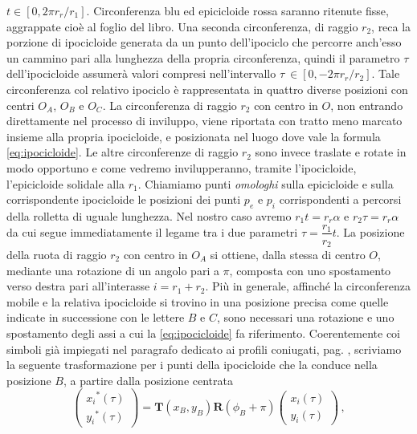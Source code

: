  $t \in[0, 2\pi r_r/r_1]$. Circonferenza blu ed epicicloide rossa saranno
ritenute fisse, aggrappate cio\`e al foglio del libro.
\noindent Una seconda circonferenza, di raggio $r_2$, reca
la porzione di ipocicloide generata da un punto dell'ipociclo
che percorre anch'esso un cammino pari alla lunghezza della propria circonferenza, quindi
il parametro $\tau$ dell'ipocicloide
assumer\`a valori compresi nell'intervallo $\tau\ \in [0, -2\pi r_r/r_2]$.
Tale circonferenza col relativo ipociclo \`e rappresentata in quattro
diverse posizioni
con centri $O_{\scriptscriptstyle A}$, $O_{\scriptscriptstyle B}$ e $O_{\scriptscriptstyle C}$.
La circonferenza di raggio $r_2$ con centro in ${O}$,
non entrando direttamente nel processo di inviluppo, viene
riportata con tratto meno marcato
insieme alla propria ipocicloide, e posizionata
nel luogo dove vale la formula \ref{eq:ipocicloide}.
Le altre circonferenze di raggio $r_2$ sono invece traslate e rotate
in modo opportuno e come vedremo invilupperanno, tramite l'ipocicloide,
l'epicicloide solidale alla $r_1$.
\noindent Chiamiamo punti
{\em omologhi} sulla epicicloide e sulla corrispondente
ipocicloide le posizioni dei punti $p_e$ e $p_i$ corrispondenti a percorsi 
della rolletta di uguale lunghezza.
Nel nostro caso avremo $r_1 t = r_r\alpha$
e $r_2 \tau= r_r\alpha$ da cui segue immediatamente il legame
tra i due parametri $\tau = \dfrac{r_1}{r_2}t$.
\noindent La posizione della ruota di raggio $r_2$ con centro in
$O_{\scriptscriptstyle A}$ si ottiene, dalla stessa di centro $O$, mediante una
rotazione di un angolo pari a $\pi$, composta con uno spostamento verso
destra pari all'interasse $i=r_1+r_2$.
Pi\`u in generale, affinch\'e la circonferenza mobile e la relativa ipocicloide
si trovino in una posizione precisa come quelle indicate 
in successione con le lettere
$B$ e $C$, sono necessari una rotazione  e uno spostamento
degli assi a cui la \ref{eq:ipocicloide} fa riferimento.
Coerentemente coi simboli gi\`a impiegati nel paragrafo dedicato
ai profili coniugati, pag. \pageref{prof_con}, scriviamo la seguente
trasformazione per i punti della ipocicloide che la conduce nella 
posizione $B$, a partire dalla posizione centrata
\begin{equation}
\begin{pmatrix} {x_i}^*\left(\tau\right)\\{y_i}^*\left(\tau\right) \end{pmatrix}
={\bm T}(x_{\scriptscriptstyle B}, y_{\scriptscriptstyle B}){\bm R}(\phi_{\scriptscriptstyle B} +\pi)
\begin{pmatrix} {x_i}\left(\tau\right)\\{y_i}\left(\tau\right) \end{pmatrix}\,,
 \label{eq:rot_trasl_i}
\end{equation}
